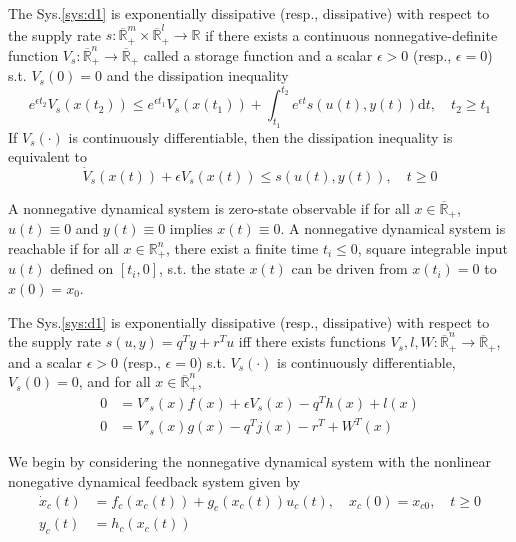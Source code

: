 \documentclass{paper}
\begin{document}
\begin{defi}
The Sys.\ref{sys:d1} is exponentially dissipative (resp., dissipative) with respect to the supply rate $s:\overline{\mathbb{R}}_{+}^{m}
\times\overline{\mathbb{R}}_{+}^{l}\rightarrow \mathbb{R}$ if there exists a continuous nonnegative-definite function 
$V_s:\overline{\mathbb{R}}_{+}^{n}\rightarrow \overline{\mathbb{R}}_{+}$ called a storage function and a scalar $\epsilon>0$
(resp., $\epsilon=0$) s.t. $V_s(0)=0$ and the dissipation inequality
\begin{equation}
e^{\epsilon t_2}V_s(x(t_2))\leqslant e^{\epsilon t_1}V_s(x(t_1)) + \int_{t_1}^{t_2}e^{\epsilon t}s(u(t),y(t))\text{d}t, \quad t_2\geqslant t_1
\end{equation}
If $V_s(\cdot)$ is continuously differentiable, then the dissipation inequality is equivalent to 
\begin{equation}
\dot{V}_s(x(t))+\epsilon V_s(x(t))\leqslant s(u(t),y(t)), \quad t\geqslant 0
\end{equation}
\end{defi}
\begin{defi}
A nonnegative dynamical system is zero-state observable if for all $x\in\overline{\mathbb{R}}_{+}$, $u(t)\equiv 0$ and $y(t)
\equiv 0$ implies $x(t)\equiv 0$. A nonnegative dynamical system is reachable if for all $x\in\mathbb{R}_+^n$, there exist a finite time
$t_i\leqslant 0$, square integrable input $u(t)$ defined on $[t_i,0]$, s.t. the state $x(t)$ can be driven from $x(t_i)=0$ to $x(0)=x_0$.
\end{defi}
\begin{thm}
The Sys.\ref{sys:d1} is exponentially dissipative (resp., dissipative) with respect to the supply rate $s(u,y)=q^Ty+r^Tu$ iff
there exists functions $V_s,l,W:\overline{\mathbb{R}}_{+}^n\rightarrow \overline{\mathbb{R}}_{+}$, and a scalar $\epsilon>0$
(resp., $\epsilon =0$) s.t. $V_s(\cdot)$ is continuously differentiable, $V_s(0)=0$, and for all $x\in\overline{\mathbb{R}}_{+}^n$,
\begin{align}
0&=V'_s(x)f(x)+\epsilon V_s(x)-q^Th(x)+l(x) \\
0&=V'_s(x)g(x)-q^Tj(x)-r^T+W^T(x) \nonumber
\end{align}
\end{thm}
We begin by considering the nonnegative dynamical system with the nonlinear nonegative dynamical feedback system given by
\begin{align}\label{sys:dc}
\dot{x}_c(t)&=f_c(x_c(t))+g_c(x_c(t))u_c(t),\quad x_c(0)=x_{c0},\quad t\geqslant 0\\
y_c(t)&=h_c(x_c(t)) \nonumber
\end{align}
\end{document}
